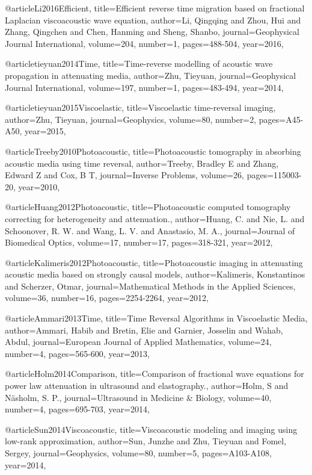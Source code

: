 {@article{Li2016Efficient,
  title={Efficient reverse time migration based on fractional {L}aplacian viscoacoustic wave equation},
  author={Li, Qingqing and Zhou, Hui and Zhang, Qingchen and Chen, Hanming and Sheng, Shanbo},
  journal={Geophysical Journal International},
  volume={204},
  number={1},
  pages={488-504},
  year={2016},
}

@article{tieyuan2014Time,
  title={Time-reverse modelling of acoustic wave propagation in attenuating media},
  author={Zhu, Tieyuan},
  journal={Geophysical Journal International},
  volume={197},
  number={1},
  pages={483-494},
  year={2014},
}

@article{tieyuan2015Viscoelastic,
  title={Viscoelastic time-reversal imaging},
  author={Zhu, Tieyuan},
  journal={Geophysics},
  volume={80},
  number={2},
  pages={A45-A50},
  year={2015},
}

@article{Treeby2010Photoacoustic,
  title={Photoacoustic tomography in absorbing acoustic media using time reversal},
  author={Treeby, Bradley E and Zhang, Edward Z and Cox, B T},
  journal={Inverse Problems},
  volume={26},
  pages={115003-20},
  year={2010},
}

@article{Huang2012Photoacoustic,
  title={Photoacoustic computed tomography correcting for heterogeneity and attenuation.},
  author={Huang, C. and Nie, L. and Schoonover, R. W. and Wang, L. V. and Anastasio, M. A.},
  journal={Journal of Biomedical Optics},
  volume={17},
  number={17},
  pages={318-321},
  year={2012},
}

@article{Kalimeris2012Photoacoustic,
  title={Photoacoustic imaging in attenuating acoustic media based on strongly causal models},
  author={Kalimeris, Konstantinos and Scherzer, Otmar},
  journal={Mathematical Methods in the Applied Sciences},
  volume={36},
  number={16},
  pages={2254-2264},
  year={2012},
}

@article{Ammari2013Time,
  title={Time Reversal Algorithms in Viscoelastic Media},
  author={Ammari, Habib and Bretin, Elie and Garnier, Josselin and Wahab, Abdul},
  journal={European Journal of Applied Mathematics},
  volume={24},
  number={4},
  pages={565-600},
  year={2013},
}

@article{Holm2014Comparison,
  title={Comparison of fractional wave equations for power law attenuation in ultrasound and elastography.},
  author={Holm, S and Näsholm, S. P.},
  journal={Ultrasound in Medicine \& Biology},
  volume={40},
  number={4},
  pages={695-703},
  year={2014},
}

@article{Sun2014Viscoacoustic,
  title={Viscoacoustic modeling and imaging using low-rank approximation},
  author={Sun, Junzhe and Zhu, Tieyuan and Fomel, Sergey},
  journal={Geophysics},
  volume={80},
  number={5},
  pages={A103-A108},
  year={2014},
}

}
